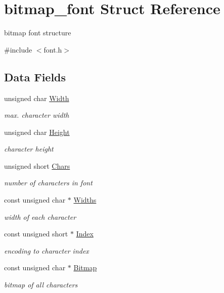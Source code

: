 \hypertarget{a00162}{}\section{bitmap\+\_\+font Struct Reference}
\label{a00162}


bitmap font structure  




{\ttfamily \#include $<$font.\+h$>$}

\subsection*{Data Fields}
\begin{DoxyCompactItemize}
\item 
unsigned char \hyperlink{a00162_a5fd6d0a33019bd0f6bd8fddb781d0fb6_a5fd6d0a33019bd0f6bd8fddb781d0fb6}{Width}
\begin{DoxyCompactList}\small\item\em max. character width \end{DoxyCompactList}\item 
unsigned char \hyperlink{a00162_a7f8ce01f522fe563639143b8faf083e2_a7f8ce01f522fe563639143b8faf083e2}{Height}
\begin{DoxyCompactList}\small\item\em character height \end{DoxyCompactList}\item 
unsigned short \hyperlink{a00162_a1d0dbc487d921c45ae1419e97c33c41c_a1d0dbc487d921c45ae1419e97c33c41c}{Chars}
\begin{DoxyCompactList}\small\item\em number of characters in font \end{DoxyCompactList}\item 
const unsigned char $\ast$ \hyperlink{a00162_a3a1e3ffc2049965887e2bd1381f8b92d_a3a1e3ffc2049965887e2bd1381f8b92d}{Widths}
\begin{DoxyCompactList}\small\item\em width of each character \end{DoxyCompactList}\item 
const unsigned short $\ast$ \hyperlink{a00162_a72c4ded43e9810921241d01911e9d3f5_a72c4ded43e9810921241d01911e9d3f5}{Index}
\begin{DoxyCompactList}\small\item\em encoding to character index \end{DoxyCompactList}\item 
const unsigned char $\ast$ \hyperlink{a00162_ad5f8561f63d121264f9d439594a16823_ad5f8561f63d121264f9d439594a16823}{Bitmap}
\begin{DoxyCompactList}\small\item\em bitmap of all characters \end{DoxyCompactList}\end{DoxyCompactItemize}


